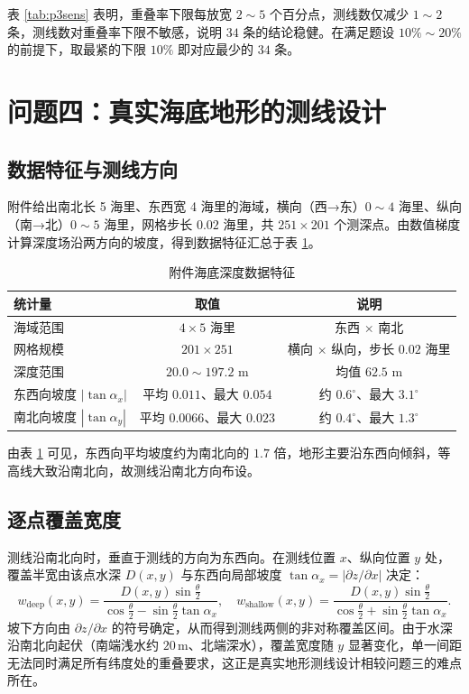 \documentclass[12pt]{ctexart}
\begin{document}
表 \ref{tab:p3sens} 表明，重叠率下限每放宽 $2\sim5$ 个百分点，测线数仅减少 $1\sim2$ 条，测线数对重叠率下限不敏感，说明 $34$ 条的结论稳健。在满足题设 $10\%\sim20\%$ 的前提下，取最紧的下限 $10\%$ 即对应最少的 $34$ 条。

\section{问题四：真实海底地形的测线设计}

\subsection{数据特征与测线方向}

附件给出南北长 5 海里、东西宽 4 海里的海域，横向（西→东）$0\sim4$ 海里、纵向（南→北）$0\sim5$ 海里，网格步长 $0.02$ 海里，共 $251\times201$ 个测深点。由数值梯度计算深度场沿两方向的坡度，得到数据特征汇总于表 \ref{tab:data}。

\begin{table}[H]\centering
\caption{附件海底深度数据特征}
\label{tab:data}
\begin{tabular}{lcc}
\toprule
统计量 & 取值 & 说明 \\
\midrule
海域范围 & $4\times5$ 海里 & 东西 $\times$ 南北 \\
网格规模 & $201\times251$ & 横向 $\times$ 纵向，步长 $0.02$ 海里 \\
深度范围 & $20.0\sim197.2$ m & 均值 $62.5$ m \\
东西向坡度 $|\tan\alpha_x|$ & 平均 $0.011$、最大 $0.054$ & 约 $0.6^\circ$、最大 $3.1^\circ$ \\
南北向坡度 $|\tan\alpha_y|$ & 平均 $0.0066$、最大 $0.023$ & 约 $0.4^\circ$、最大 $1.3^\circ$ \\
\bottomrule
\end{tabular}
\end{table}

由表 \ref{tab:data} 可见，东西向平均坡度约为南北向的 $1.7$ 倍，地形主要沿东西向倾斜，等高线大致沿南北向，故测线沿南北方向布设。

\subsection{逐点覆盖宽度}

测线沿南北向时，垂直于测线的方向为东西向。在测线位置 $x$、纵向位置 $y$ 处，覆盖半宽由该点水深 $D(x,y)$ 与东西向局部坡度 $\tan\alpha_x=\left|\partial z/\partial x\right|$ 决定：
\begin{equation}
w_{\mathrm{deep}}(x,y)=\frac{D(x,y)\sin\frac{\theta}{2}}{\cos\frac{\theta}{2}-\sin\frac{\theta}{2}\tan\alpha_x},\quad
w_{\mathrm{shallow}}(x,y)=\frac{D(x,y)\sin\frac{\theta}{2}}{\cos\frac{\theta}{2}+\sin\frac{\theta}{2}\tan\alpha_x}.
\end{equation}
坡下方向由 $\partial z/\partial x$ 的符号确定，从而得到测线两侧的非对称覆盖区间。由于水深沿南北向起伏（南端浅水约 $20\,\mathrm{m}$、北端深水），覆盖宽度随 $y$ 显著变化，单一间距无法同时满足所有纬度处的重叠要求，这正是真实地形测线设计相较问题三的难点所在。
\end{document}
